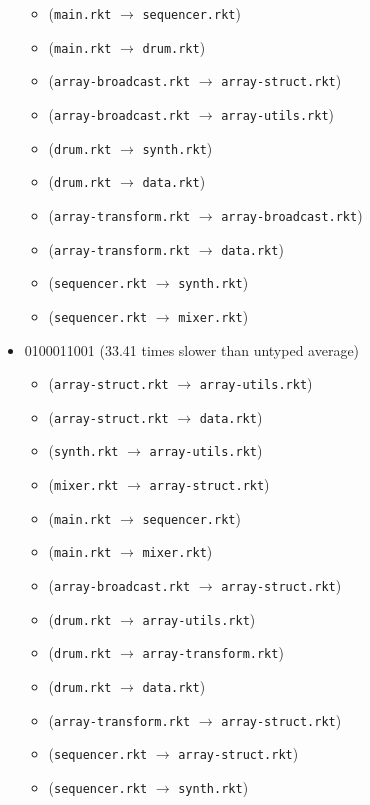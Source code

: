 \documentclass{article}
\newcommand{\mono}[1]{\texttt{#1}}
\begin{document}
\begin{itemize}
\begin{itemize}
  \item (\mono{main.rkt} $\rightarrow$ \mono{sequencer.rkt})
  \item (\mono{main.rkt} $\rightarrow$ \mono{drum.rkt})
  \item (\mono{array-broadcast.rkt} $\rightarrow$ \mono{array-struct.rkt})
  \item (\mono{array-broadcast.rkt} $\rightarrow$ \mono{array-utils.rkt})
  \item (\mono{drum.rkt} $\rightarrow$ \mono{synth.rkt})
  \item (\mono{drum.rkt} $\rightarrow$ \mono{data.rkt})
  \item (\mono{array-transform.rkt} $\rightarrow$ \mono{array-broadcast.rkt})
  \item (\mono{array-transform.rkt} $\rightarrow$ \mono{data.rkt})
  \item (\mono{sequencer.rkt} $\rightarrow$ \mono{synth.rkt})
  \item (\mono{sequencer.rkt} $\rightarrow$ \mono{mixer.rkt})
  \end{itemize}
\item 0100011001 (33.41 times slower than untyped average)
  \begin{itemize}
  \item (\mono{array-struct.rkt} $\rightarrow$ \mono{array-utils.rkt})
  \item (\mono{array-struct.rkt} $\rightarrow$ \mono{data.rkt})
  \item (\mono{synth.rkt} $\rightarrow$ \mono{array-utils.rkt})
  \item (\mono{mixer.rkt} $\rightarrow$ \mono{array-struct.rkt})
  \item (\mono{main.rkt} $\rightarrow$ \mono{sequencer.rkt})
  \item (\mono{main.rkt} $\rightarrow$ \mono{mixer.rkt})
  \item (\mono{array-broadcast.rkt} $\rightarrow$ \mono{array-struct.rkt})
  \item (\mono{drum.rkt} $\rightarrow$ \mono{array-utils.rkt})
  \item (\mono{drum.rkt} $\rightarrow$ \mono{array-transform.rkt})
  \item (\mono{drum.rkt} $\rightarrow$ \mono{data.rkt})
  \item (\mono{array-transform.rkt} $\rightarrow$ \mono{array-struct.rkt})
  \item (\mono{sequencer.rkt} $\rightarrow$ \mono{array-struct.rkt})
  \item (\mono{sequencer.rkt} $\rightarrow$ \mono{synth.rkt})

\end{itemize}
\end{itemize}
\end{document}
